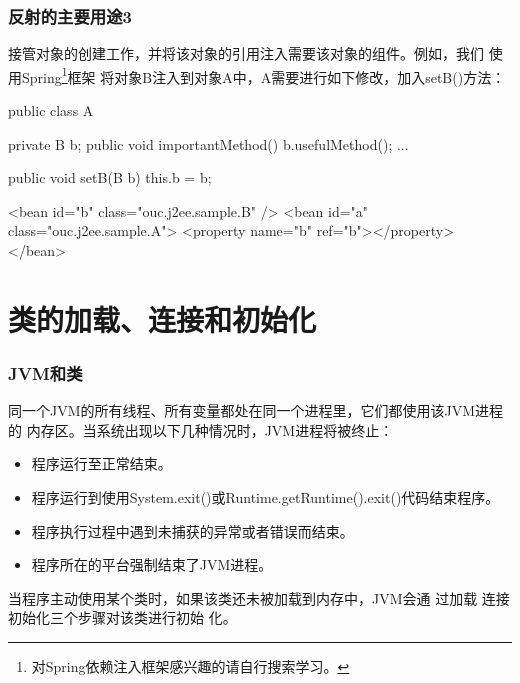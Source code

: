 \begin{frame}[fragile] %
  \frametitle{反射的主要用途3}


  接管对象的创建工作，并将该对象的引用注入需要该对象的组件。例如，我们
  使用Spring\footnote{对Spring依赖注入框架感兴趣的请自行搜索学习。}框架
  将对象B注入到对象A中，A需要进行如下修改，加入setB()方法：

  \begin{javaCode}
    public class A {
      private B b;
      public void importantMethod() {
        b.usefulMethod();
        ...
      }

      public void setB(B b) {
        this.b = b;
      }
    }   

  \end{javaCode}


  \begin{xmlCode}
    <bean id="b" class="ouc.j2ee.sample.B" />
    <bean id="a" class="ouc.j2ee.sample.A">
      <property name="b" ref="b"></property>
    </bean>
  \end{xmlCode}
\end{frame}

\section{类的加载、连接和初始化}

\begin{frame}[fragile] %
\frametitle{JVM和类}


同一个JVM的所有线程、所有变量都处在同一个进程里，它们都使用该JVM进程的
内存区。当系统出现以下几种情况时，JVM进程将被终止：

\begin{itemize}\kai
\item 程序运行至正常结束。
\item 程序运行到使用System.exit()或Runtime.getRuntime().exit()代码结束程序。
\item 程序执行过程中遇到未捕获的异常或者错误而结束。
\item 程序所在的平台强制结束了JVM进程。
\end{itemize}

\pause{}

{\hei 当程序主动使用某个类时，如果该类还未被加载到内存中，JVM会通
  过{\Red 加载  连接  初始化}三个步骤对该类进行初始
  化。}
\end{frame}

